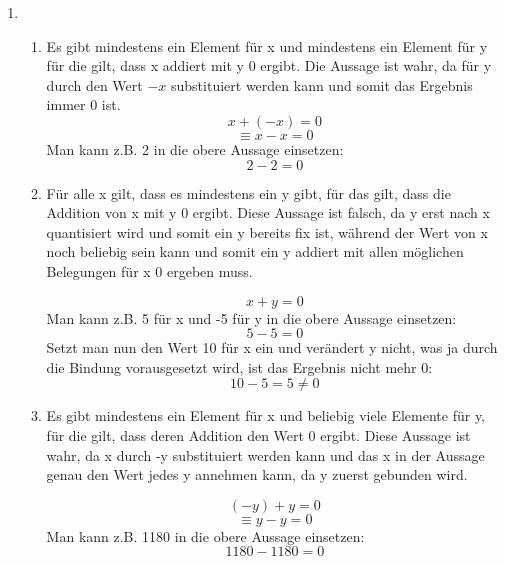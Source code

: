 \documentclass[a4paper]{article}
\begin{document}
	\begin{enumerate}
		\item
		\begin{enumerate}
			\item
			Es gibt mindestens ein Element für x und mindestens ein Element für y für die gilt, dass x addiert mit y 0 ergibt.
			\newline
			Die Aussage ist wahr, da für y durch den Wert $-x$ substituiert werden kann und somit das Ergebnis immer 0 ist.
			\begin{equation*}
				x + (-x) = 0
			\end{equation*}
			\begin{equation*}
				\equiv x - x = 0
			\end{equation*}
			Man kann z.B. 2 in die obere Aussage einsetzen:
			\begin{equation*}
				2 - 2 = 0
			\end{equation*}
			
			\item
			Für alle x gilt, dass es mindestens ein y gibt, für das gilt, dass die Addition von x mit y 0 ergibt.
			\newline
			Diese Aussage ist falsch, da y erst nach x quantisiert wird und somit ein y bereits fix ist, während der Wert von x noch beliebig sein kann und somit ein y addiert mit allen möglichen Belegungen für x 0 ergeben muss.
			
			\begin{equation*}
				x + y = 0
			\end{equation*}
			Man kann z.B. 5 für x und -5 für y in die obere Aussage einsetzen:
			\begin{equation*}
				5 - 5 = 0
			\end{equation*}
			Setzt man nun den Wert 10 für x ein und verändert y nicht, was ja durch die Bindung vorausgesetzt wird, ist das Ergebnis nicht mehr 0:
			\begin{equation*}
				10 - 5 = 5 \neq 0
			\end{equation*}
			
			\item
			Es gibt mindestens ein Element für x und beliebig viele Elemente für y, für die gilt, dass deren Addition den Wert 0 ergibt.
			\newline
			Diese Aussage ist wahr, da x durch -y substituiert werden kann und das x in der Aussage genau den Wert jedes y annehmen kann, da y zuerst gebunden wird.
			
			\begin{equation*}
				(-y) + y = 0
			\end{equation*}
			\begin{equation*}
				\equiv y - y = 0
			\end{equation*}
			Man kann z.B. 1180 in die obere Aussage einsetzen:
			\begin{equation*}
				1180 - 1180 = 0
			\end{equation*}
			

\end{enumerate}
\end{enumerate}
\end{document}
